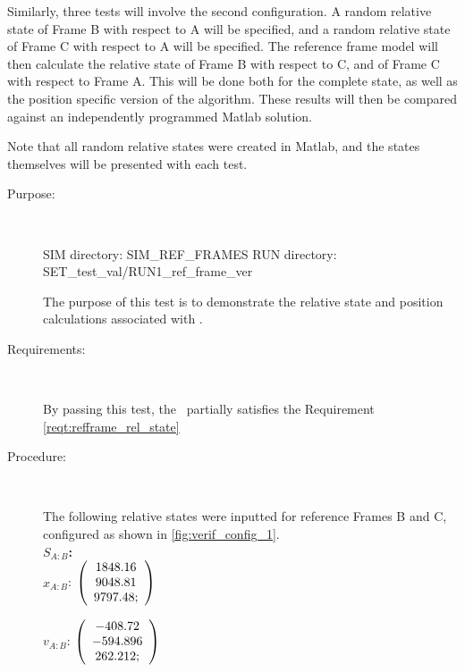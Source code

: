 Similarly, three tests will involve the second configuration. A random relative
state of Frame B with respect to A will be specified, and a random relative state
of Frame C with respect to A will be specified. The reference frame model
will then calculate the relative state of Frame B with respect to C, and
of Frame C with respect to Frame A. This will be done both for the complete state,
as well as the position specific version of the algorithm. These results
will then be compared against an independently programmed Matlab solution.

Note that all random relative states were created in Matlab, and the states
themselves will be presented with each test.

\label{test:refframe_test_1}
\begin{description}
\item[Purpose:] \ \newline

SIM directory: SIM\_REF\_FRAMES
RUN directory: SET\_test\_val/RUN1\_ref\_frame\_ver

The purpose of this test is to demonstrate the relative state and
position calculations associated with .

\item[Requirements:] \ \newline

By passing this test, the \ partially satisfies
the Requirement \ref{reqt:refframe_rel_state}

\item[Procedure:] \ \newline

The following relative states were inputted for reference Frames B and
C, configured as shown in \ref{fig:verif_config_1}. \\

\Large{\textbf{$S_{A:B}$:}} \normalsize \\

$x_{A:B}$:  $\left( \begin{array} {ccc} 1848.16 \\ 9048.81 \\ 9797.48;
\end{array} \right) \\ \\$

$v_{A:B}$:   $\left( \begin{array} {ccc}  -408.72 \\ -594.896 \\ 262.212;
\end{array} \right) \\ \\$


\end{description}
